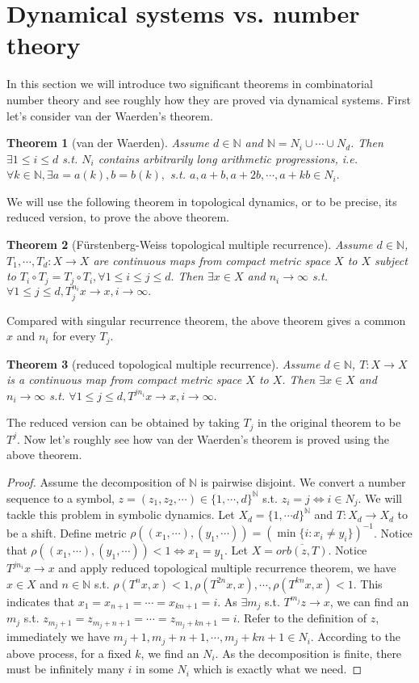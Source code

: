 \documentclass[12pt]{article}
\newtheorem{theorem}{Theorem}
\begin{document}
\section{Dynamical systems vs. number theory}
In this section we will introduce two significant theorems in combinatorial number theory and see roughly how they are proved via dynamical systems. First let's consider van der Waerden's theorem.
\begin{theorem}[van der Waerden]
Assume $d\in \mathbb{N}$ and $\mathbb{N} =N_i\cup\cdots\cup N_d$. Then $\exists 1\le i\le d $ s.t. $N_i$ contains arbitrarily long arithmetic progressions, i.e. $\forall k\in \mathbb N,\exists a=a(k),b=b(k), $ s.t. $a,a+b,a+2b,\cdots,a+kb\in N_i. $
\end{theorem}
We will use the following theorem in topological dynamics, or to be precise, its reduced version, to prove the above theorem.
\begin{theorem}[F\"urstenberg-Weiss topological multiple recurrence]
Assume $d\in \mathbb N$, $T_1,\cdots,T_d:X\to X $ are continuous maps from compact metric space $X$ to $X$ subject to $T_i\circ T_j=T_j\circ T_i,\forall 1\le i\le j\le d. $ Then $\exists x\in X $ and $n_i\to\infty $ s.t. $\forall 1\le j\le d,T_j^{n_i}x\to x,i\to\infty. $
\end{theorem}
Compared with singular recurrence theorem, the above theorem gives a common $x$ and $n_i$ for every $T_j$.
\begin{theorem}[reduced topological multiple recurrence]
Assume $d\in \mathbb N$, $T:X\to X$ is a continuous map from compact metric space $X$ to $X$. Then $\exists x\in X$ and $n_i\to \infty $ s.t. $\forall 1\le j\le d, T^{jn_i}x\to x,i\to\infty.$
\end{theorem}
The reduced version can be obtained by taking $T_j $ in the original theorem to be $T^j $. Now let's roughly see how van der Waerden's theorem is proved using the above theorem.
\begin{proof}
Assume the decomposition of $\mathbb N$ is pairwise disjoint. We convert a number sequence to a symbol, $z=(z_1,z_2,\cdots)\in \{1,\cdots,d \}^{\mathbb N} $ s.t. $z_i=j\iff i\in N_j. $ We will tackle this problem in symbolic dynamics. Let $X_d=\{1,\cdots d \}^{\mathbb N}$ and $T:X_d\to X_d $ to be a shift. Define metric $\rho((x_1,\cdots),(y_1,\cdots))=(\min\{i:x_i\ne y_i \})^{-1} $. Notice that $\rho((x_1,\cdots),(y_1,\cdots))<1 \iff x_1=y_1. $ Let $X=\overline{orb(z,T)} $. Notice $T^{jn_i}x\to x $ and apply reduced topological multiple recurrence theorem, we have $x\in X $ and $n\in \mathbb N$ s.t. $\rho(T^nx,x)<1,\rho(T^{2n}x,x),\cdots,\rho(T^{kn}x,x)<1$. This indicates that $x_1=x_{n+1}=\cdots=x_{kn+1}=i. $ As $\exists m_j $ s.t. $T^{m_j}z\to x $, we can find an $m_j $ s.t. $z_{m_j+1}=z_{m_j+n+1}=\cdots=z_{m_j+kn+1}=i. $ Refer to the definition of $z$, immediately we have $m_j+1,m_j+n+1,\cdots,m_j+kn+1\in N_i.$ According to the above process, for a fixed $k$, we find an $N_i$. As the decomposition is finite, there must be infinitely many $i$ in some $N_i$ which is exactly what we need.
\end{proof}
\end{document}
